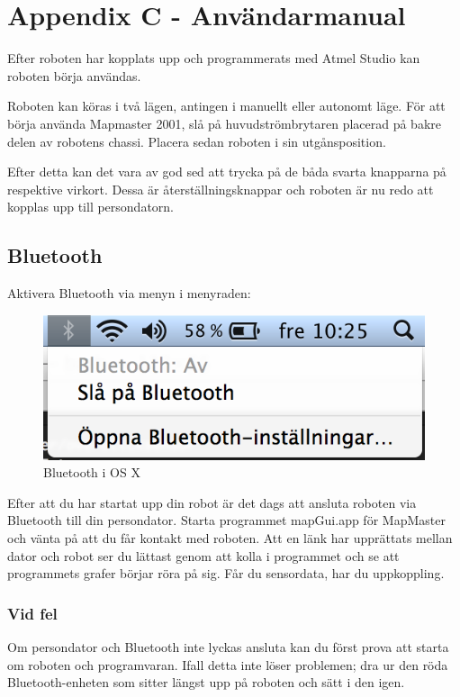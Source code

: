 \documentclass[a4paper,12pt,fleqn]{article}
\begin{document}
\section{Appendix C - Användarmanual}

Efter roboten har kopplats upp och programmerats med Atmel Studio kan roboten börja användas. 

Roboten kan köras i två lägen, antingen i manuellt eller autonomt läge. För att börja använda Mapmaster 2001, slå på huvudströmbrytaren placerad på bakre delen av robotens chassi. Placera sedan roboten i sin utgånsposition. 

Efter detta kan det vara av god sed att trycka på de båda svarta knapparna på respektive virkort. Dessa är återställningsknappar och roboten är nu redo att kopplas upp till persondatorn. 

\subsection{Bluetooth}
Aktivera Bluetooth via menyn i menyraden: 

\begin{figure}[htp] %
  \begin{center}
  \includegraphics[keepaspectratio=true,width=0.5\linewidth]{bilder/bluetooth.png}  %
  \end{center}
  \caption{Bluetooth i OS X} %
  \label{fig:bluetooth}
\end{figure}

Efter att du har startat upp din robot är det dags att ansluta roboten via Bluetooth till din persondator. Starta programmet mapGui.app för MapMaster och vänta på att du får kontakt med roboten. Att en länk har upprättats mellan dator och robot ser du lättast genom att kolla i programmet och se att programmets grafer börjar röra på sig. Får du sensordata, har du uppkoppling. 

\subsubsection{Vid fel}
Om persondator och Bluetooth inte lyckas ansluta kan du först prova att starta om roboten och programvaran. Ifall detta inte löser problemen; dra ur den röda Bluetooth-enheten som sitter längst upp på roboten och sätt i den igen. 
\end{document}
